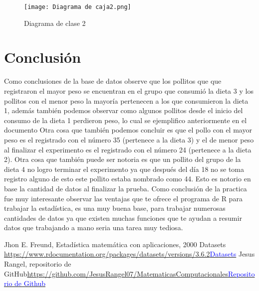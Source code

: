 \documentclass{article}
\begin{document}
\newpage
\begin{figure}[h]
    \centering
    \texttt{[image: Diagrama de caja2.png]}
    \caption{Diagrama de clase 2 }
    \label{fig:mesh15}
\end{figure}

\section{Conclusión}
Como conclusiones de la base de datos observe que los pollitos que  que registraron el mayor peso se encuentran en el grupo que consumió la dieta 3 y los pollitos con el menor peso la mayoría pertenecen a los que consumieron la dieta 1, además también podemos observar como algunos pollitos desde el inicio del consumo de la dieta 1 perdieron peso, lo cual se ejemplifico anteriormente en el documento
Otra cosa que también podemos concluir es que el pollo con el mayor peso es el registrado con el número 35 (pertenece a la dieta 3) y el de menor peso al finalizar el experimento es el registrado con el número 24 (pertenece a la dieta 2).
Otra cosa que también puede ser notoria es que un pollito del grupo de la dieta 4 no logro terminar el experimento ya que después del día 18 no se toma registro alguno de esto este pollito estaba nombrado como 44. Esto es notorio en base la cantidad de datos al finalizar la prueba.
Como conclusión de la practica fue muy interesante observar las ventajas que te ofrece el programa de R para trabajar la estadística, es una muy buena base, para trabajar numerosas cantidades de datos ya que existen muchas funciones que te ayudan a resumir datos que trabajando a mano seria una tarea muy tediosa.

\newpage
\begin{thebibliography}{0}
   Jhon E. Freund, Estadística matemática con aplicaciones, 2000
   Datasets \textcolor{blue}{\url{https://www.rdocumentation.org/packages/datasets/versions/3.6.2}}\href{https://www.rdocumentation.org/packages/datasets/versions/3.6.2}{\textcolor{blue}{Datasets}}
  Jesus Rangel, repositorio de GitHub\textcolor{blue}{\url{https://github.com/JesusRangel07/MatematicasComputacionales}}\href{https://github.com/JesusRangel07/MatematicasComputacionales}{\textcolor{blue}{Repositorio de Github}}
\end{thebibliography}
\end{document}
